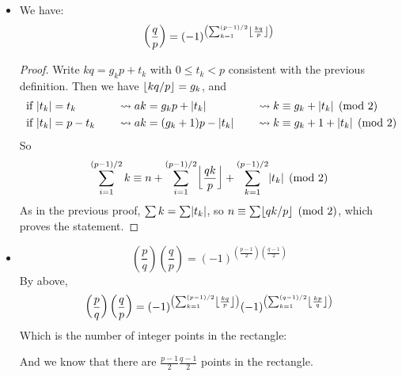 \begin{prop}
\begin{itemize}
\begin{proof}
\[\begin{cases}
            p - t_j & \text{ If } p/2 < t_j < p \quad (t_j \equiv -\abs{t_j})
        \end{cases} \]
      Notice that $\abs{t_i}$ takes value between $1$ and $(p-1)/2$,
      and $\abs{ra} \equiv \abs{sa} \pmod{p} \implies
      ra \equiv sa \pmod{p} \implies r \equiv \pm s \pmod{p}$ since $\gcd(a, p) = 1$.
      So $t_k$ would have distinct value for $1 \leq k \leq (p-1)/2$.
      Thus
      \[ \prod t_k \equiv \frac{p-1}{2}! a^{(p-1)/2} \equiv (-1)^n \frac{p-1}{2}!
        \implies a^{(p-1)/2} \equiv (-1)^n \]
      \end{proof}
    \item We have:
      \[ \left( \frac{q}{p} \right) = (-1)^{\left( \sum_{k=1}^{(p-1)/2} \floor*{\frac{kq}{p}} \right)} \]
      \begin{proof}
        Write $kq = g_k p + t_k$ with $0 \leq t_k < p$ consistent with the previous definition.
        Then we have $\floor{kq / p} = g_k$, and
        \begin{alignat*}{4}
          & \text{ if } \abs{t_k} = t_k && \leadsto ak = g_k p + \abs{t_k} &&
          \leadsto k \equiv g_k + \abs{t_k} \pmod{2} \\
          & \text{ if } \abs{t_k} = p - t_k \quad && \leadsto ak = (g_k+1) p - \abs{t_k} \quad &&
          \leadsto k \equiv g_k + 1 + \abs{t_k} \pmod{2} \\
        \end{alignat*}
        So
        \[ \sum_{i = 1}^{(p-1)/2} k \equiv n + \sum_{i=1}^{(p-1)/2} \floor*{\frac{qk}{p}}
          + \sum_{k=1}^{(p-1)/2} \abs{t_k} \pmod{2} \]
        As in the previous proof, $\sum k = \sum \abs{t_k}$, so $n \equiv \sum \floor{qk/p} \pmod{2}$,
        which proves the statement.
      \end{proof}
    \item
      \[ \left( \frac{p}{q} \right) \left( \frac{q}{p} \right)
        = (-1)^{\left(\frac{p-1}{2}\right) \left(\frac{q-1}{2}\right)} \]
      By above,
      \[ \left( \frac{p}{q} \right) \left( \frac{q}{p} \right)
        = (-1)^{\left( \sum_{k=1}^{(p-1)/2} \floor*{\frac{kq}{p}} \right)}
        (-1)^{\left( \sum_{k=1}^{(q-1)/2} \floor*{\frac{kp}{q}} \right)} 
      \]
      Which is the number of integer points in the rectangle:
      \begin{figure}[H]
        \centering
      \end{figure}
      And we know that there are $\frac{p-1}{2} \frac{q-1}{2}$ points in the rectangle.
  \end{itemize}
\end{prop}
